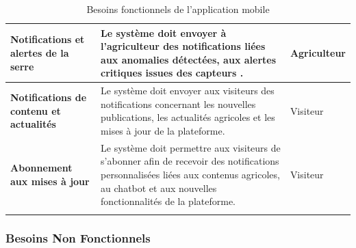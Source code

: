 \begin{longtable}{|p{}|>{\raggedright\arraybackslash}p{}|>{\raggedright\arraybackslash}p{}|}
	\textbf{Notifications et alertes de la serre} &
	Le système doit envoyer à l’agriculteur des notifications liées aux anomalies détectées, aux alertes critiques issues des capteurs . &
	Agriculteur \\ \hline
	
	\textbf{Notifications de contenu et actualités} &
	Le système doit envoyer aux visiteurs des notifications concernant les nouvelles publications, les actualités agricoles et les mises à jour de la plateforme. &
	Visiteur \\ \hline
	
	\textbf{Abonnement aux mises à jour} &
	Le système doit permettre aux visiteurs de s’abonner afin de recevoir des notifications personnalisées liées aux contenus agricoles, au chatbot et aux nouvelles fonctionnalités de la plateforme. &
	Visiteur \\ \hline
	
	\caption{Besoins fonctionnels de l’application mobile}
	\label{tab:bf-mobile}
\end{longtable}
\endgroup
\subsubsection{Besoins Non Fonctionnels}


\begingroup
\footnotesize %
\setlength{\tabcolsep}{4pt} %
\renewcommand{\arraystretch}{1.2} %


